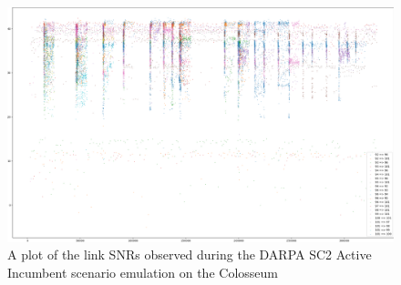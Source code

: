 \documentclass[12pt, draftcls, onecolumn]{IEEEtran}
\begin{document}
\begin{figure} [htb]
    \centerline{
    \includegraphics[width = 0.8\linewidth]{figures/Active_Incumbent_Scenario_Link_SNRs.png}}
    \caption{A plot of the link SNRs observed during the DARPA SC2 Active Incumbent scenario emulation on the Colosseum}
    \label{fig: Y. 2}
\end{figure}
\end{document}
